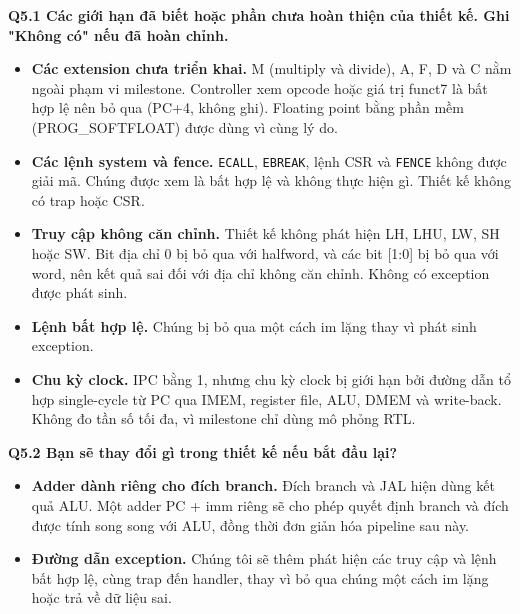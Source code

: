 \documentclass[10pt,a4paper]{article}
\newcommand{\code}[1]{\texttt{#1}}
\begin{document}
\begin{center}
\end{center}
\textbf{Q5.1 Các giới hạn đã biết hoặc phần chưa hoàn thiện của thiết kế. Ghi
"Không có" nếu đã hoàn chỉnh.}

\begin{itemize}
  \item \textbf{Các extension chưa triển khai.} M (multiply và divide), A, F, D
        và C nằm ngoài phạm vi milestone. Controller xem
        opcode hoặc giá trị funct7 là bất hợp lệ nên bỏ qua (PC+4, không
        ghi). Floating point bằng phần mềm (PROG\_SOFTFLOAT) được dùng vì
        cùng lý do.
  \item \textbf{Các lệnh system và fence.} \code{ECALL}, \code{EBREAK},
        lệnh CSR và \code{FENCE} không được giải mã. Chúng được xem là bất
        hợp lệ và không thực hiện gì. Thiết kế không có trap hoặc CSR.
  \item \textbf{Truy cập không căn chỉnh.} Thiết kế không phát hiện
        LH, LHU, LW, SH hoặc SW. Bit địa chỉ 0 bị bỏ qua với halfword, và
        các bit [1:0] bị bỏ qua với word, nên kết quả sai đối với địa chỉ
        không căn chỉnh. Không có exception được phát sinh.
  \item \textbf{Lệnh bất hợp lệ.} Chúng bị bỏ qua một cách im lặng thay vì
        phát sinh exception.
  \item \textbf{Chu kỳ clock.} IPC bằng 1, nhưng chu kỳ clock bị giới hạn bởi
        đường dẫn tổ hợp single-cycle từ PC qua IMEM, register
        file, ALU, DMEM và write-back. Không đo tần số tối đa,
        vì milestone chỉ dùng mô phỏng RTL.
\end{itemize}

\textbf{Q5.2 Bạn sẽ thay đổi gì trong thiết kế nếu bắt đầu lại?}

\begin{itemize}
  \item \textbf{Adder dành riêng cho đích branch.} Đích branch và JAL hiện dùng
        kết quả ALU. Một adder PC + imm riêng sẽ cho phép quyết định branch và
        đích được tính song song với ALU, đồng thời đơn giản hóa pipeline sau này.
  \item \textbf{Đường dẫn exception.} Chúng tôi sẽ thêm phát hiện các truy cập
        và lệnh bất hợp lệ, cùng trap đến handler, thay vì bỏ qua chúng một
        cách im lặng hoặc trả về dữ liệu sai.
\end{itemize}
\end{document}
